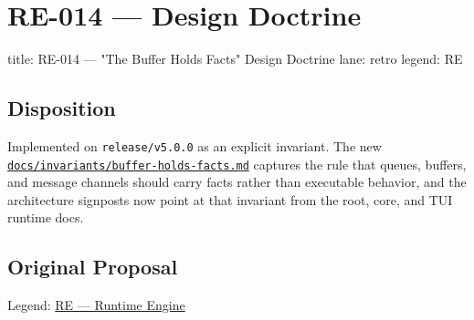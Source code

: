 \chapter{RE-014 ---  Design Doctrine}\label{record-400}

\smallskip

\begin{RecordMeta}
title: RE-014 — "The Buffer Holds Facts" Design Doctrine
lane: retro
legend: RE

\end{RecordMeta}

\section{Disposition}\label{record-400-disposition}

Implemented on \texttt{r\allowbreak{}e\allowbreak{}l\allowbreak{}e\allowbreak{}a\allowbreak{}s\allowbreak{}e\allowbreak{}/\allowbreak{}v\allowbreak{}5\allowbreak{}.\allowbreak{}0\allowbreak{}.\allowbreak{}0} as an explicit invariant. The new \href{https://github.com/flyingrobots/bijou/blob/cbd70612140e7a450d764b3c7be1c6af878b99bc/docs/method/invariants/buffer-holds-facts.md}{\texttt{d\allowbreak{}o\allowbreak{}c\allowbreak{}s\allowbreak{}/\allowbreak{}i\allowbreak{}n\allowbreak{}v\allowbreak{}a\allowbreak{}r\allowbreak{}i\allowbreak{}a\allowbreak{}n\allowbreak{}t\allowbreak{}s\allowbreak{}/\allowbreak{}b\allowbreak{}u\allowbreak{}f\allowbreak{}f\allowbreak{}e\allowbreak{}r\allowbreak{}-\allowbreak{}h\allowbreak{}o\allowbreak{}l\allowbreak{}d\allowbreak{}s\allowbreak{}-\allowbreak{}f\allowbreak{}a\allowbreak{}c\allowbreak{}t\allowbreak{}s\allowbreak{}.\allowbreak{}m\allowbreak{}d}} captures the rule that queues, buffers, and message channels should carry facts rather than executable behavior, and the architecture signposts now point at that invariant from the root, core, and TUI runtime docs.

\section{Original Proposal}\label{record-400-original-proposal}

Legend: \href{https://github.com/flyingrobots/bijou/blob/1853ad902f6bf219326409e7f743a5a1d6517dbc/docs/method/legends/RE-runtime-engine.md}{RE --- Runtime Engine}

